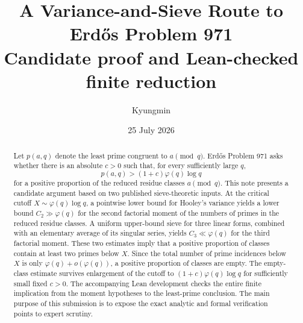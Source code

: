 \documentclass[11pt]{article}
\title{\bfseries A Variance-and-Sieve Route to Erd\H{o}s Problem 971\\[0.5em]
\large Candidate proof and Lean-checked finite reduction}
\author{Kyungmin}
\date{25 July 2026}
\theoremstyle{definition}
\theoremstyle{remark}
\newcommand{\ph}{\varphi}
\begin{document}
\maketitle

\begin{center}
\end{center}

\begin{abstract}
Let $p(a,q)$ denote the least prime congruent to $a \pmod q$.
Erd\H{o}s Problem 971 asks whether there is an absolute $c>0$ such that, for every sufficiently large $q$,
\[
  p(a,q)>(1+c)\ph(q)\log q
\]
for a positive proportion of the reduced residue classes $a\pmod q$.
This note presents a candidate argument based on two published sieve-theoretic inputs.
At the critical cutoff $X\sim \ph(q)\log q$, a pointwise lower bound for Hooley's variance yields a lower bound $C_2\gg\ph(q)$ for the second factorial moment of the numbers of primes in the reduced residue classes.
A uniform upper-bound sieve for three linear forms, combined with an elementary average of its singular series, yields $C_3\ll\ph(q)$ for the third factorial moment.
These two estimates imply that a positive proportion of classes contain at least two primes below $X$.
Since the total number of prime incidences below $X$ is only $\ph(q)+o(\ph(q))$, a positive proportion of classes are empty.
The empty-class estimate survives enlargement of the cutoff to $(1+c)\ph(q)\log q$ for sufficiently small fixed $c>0$.
The accompanying Lean development checks the entire finite implication from the moment hypotheses to the least-prime conclusion.
The main purpose of this submission is to expose the exact analytic and formal verification points to expert scrutiny.
\end{abstract}
\end{document}
